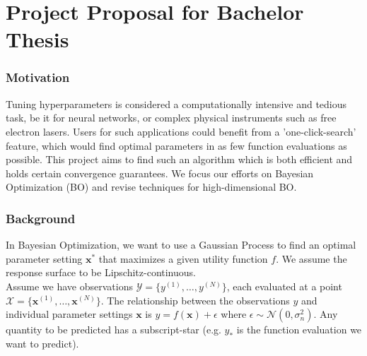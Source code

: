 \documentclass[a4paper,12pt,twoside,openright]{report}
\begin{document}
\pagestyle{empty}
\singlespacing

\onehalfspacing

\singlespacing


\setcounter{page}{0}
\pagestyle{plain}

\singlespacing
\tableofcontents
\listoffigures
\listoftables

{}

\chapter{Project Proposal for Bachelor Thesis}
\subsection{Motivation}

Tuning hyperparameters is considered a computationally intensive and tedious task, be it for neural networks, or complex physical instruments such as free electron lasers.
Users for such applications could benefit from a 'one-click-search' feature, which would find optimal parameters in as few function evaluations as possible.
This project aims to find such an algorithm which is both efficient and holds certain convergence guarantees.
We focus our efforts on Bayesian Optimization (BO) and revise techniques for high-dimensional BO. \\

\subsection{Background}

In Bayesian Optimization, we want to use a Gaussian Process to find an optimal parameter setting $\mathbf{x^*}$ that maximizes a given utility function $f$.
We assume the response surface to be Lipschitz-continuous. \\

Assume we have observations $ \mathcal{Y} = \{ y^{(1)}, \ldots, y^{(N)} \}$, each evaluated at a point $ \mathcal{X} = \{  \mathbf{x}^{(1)}, \ldots, \mathbf{x}^{(N)} \}$.
The relationship between the observations $y$ and individual parameter settings $\mathbf{x}$ is $y = f \left( \mathbf{x} \right) + \epsilon$ where $\epsilon \sim  \mathcal{N} \left( 0, \sigma^2_n \right)$. Any quantity to be predicted has a subscript-star (e.g. $y_*$ is the function evaluation we want to predict).\\
\end{document}
